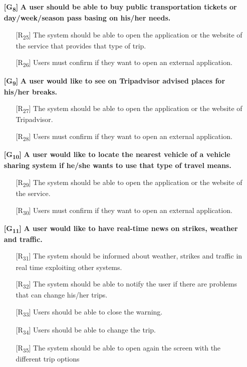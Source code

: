 \documentclass[12pt,titlepage]{article}
\begin{document}
\begin{itemize}
\item[\textbf{ {[G\textsubscript{8}]}}]	\textbf{	A user should be able to buy public transportation tickets or day/week/season pass basing on his/her needs.}
\begin{itemize}
\item[{[R\textsubscript{25}]}]  The system should be able to open the application or the website of the service that provides that type of trip.
\item[{[R\textsubscript{26}]}] Users must confirm if they want to open an external application.
\end{itemize}
\item[\textbf{ {[G\textsubscript{9}]}}]	\textbf{	A user would like to see on Tripadvisor advised places for his/her breaks.}
\begin{itemize}
\item[{[R\textsubscript{27}]}]  The system should be able to open the application or the website of Tripadvisor.
\item[{[R\textsubscript{28}]}] Users must confirm if they want to open an external application.
\end{itemize}

\item[\textbf{ {[G\textsubscript{10}]}}]	\textbf{	A user would like to locate the nearest vehicle of a vehicle sharing system if he/she wants to use that type of travel means.}
\begin{itemize}
\item[{[R\textsubscript{29}]}]  The system should be able to open the application or the website of the service.
\item[{[R\textsubscript{30}]}] Users must confirm if they want to open an external application.
\end{itemize}

\item[\textbf{ {[G\textsubscript{11}]}}]	\textbf{	A user would like to have real-time news on strikes, weather and traffic.}
\begin{itemize}
\item[{[R\textsubscript{31}]}] The system should be informed about weather, strikes and traffic in real time exploiting other systems.
\item[{[R\textsubscript{32}]}]  The system should be able to notify the user if there are problems that can change his/her trips.
\item[{[R\textsubscript{33}]}] Users should be able to close the warning.
\item[{[R\textsubscript{34}]}] Users should be able to change the trip.
\item[{[R\textsubscript{35}]}]  The system should be able to open again the screen with the different trip options
\end{itemize}
\end{itemize}
\end{document}
